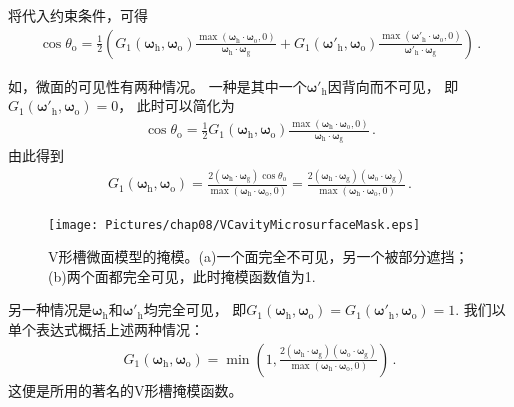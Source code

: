 将代入约束条件，可得
\begin{align}\label{eq:08ex01-V-Cavity-configurations}
    \cos\theta_{\mathrm{o}}=\frac{1}{2}\left(
    G_1({\bm\omega}_{\mathrm{h}},{\bm\omega}_{\mathrm{o}})
    \frac{\max({\bm\omega}_{\mathrm{h}}\cdot{\bm\omega}_{\mathrm{o}},0)}
    {{\bm\omega}_{\mathrm{h}}\cdot{\bm\omega}_{\mathrm{g}}}
    +G_1({\bm\omega}'_{\mathrm{h}},{\bm\omega}_{\mathrm{o}})
    \frac{\max({\bm\omega}'_{\mathrm{h}}\cdot{\bm\omega}_{\mathrm{o}},0)}
    {{\bm\omega}'_{\mathrm{h}}\cdot{\bm\omega}_{\mathrm{g}}}\right)\, .
\end{align}

如，微面的可见性有两种情况。
一种是其中一个${\bm\omega}'_{\mathrm{h}}$因背向而不可见，
即$G_1({\bm\omega}'_{\mathrm{h}},{\bm\omega}_{\mathrm{o}})=0$，
此时可以简化为
\begin{align}
    \cos\theta_{\mathrm{o}}=\frac{1}{2}G_1({\bm\omega}_{\mathrm{h}},{\bm\omega}_{\mathrm{o}})
    \frac{\max({\bm\omega}_{\mathrm{h}}\cdot{\bm\omega}_{\mathrm{o}},0)}
    {{\bm\omega}_{\mathrm{h}}\cdot{\bm\omega}_{\mathrm{g}}}\, .
\end{align}
由此得到
\begin{align}
    G_1({\bm\omega}_{\mathrm{h}},{\bm\omega}_{\mathrm{o}})
    =\frac{2({\bm\omega}_{\mathrm{h}}\cdot{\bm\omega}_{\mathrm{g}})\cos\theta_{\mathrm{o}}}
    {\max({\bm\omega}_{\mathrm{h}}\cdot{\bm\omega}_{\mathrm{o}},0)}
    =\frac{2({\bm\omega}_{\mathrm{h}}\cdot{\bm\omega}_{\mathrm{g}})
    ({\bm\omega}_{\mathrm{o}}\cdot{\bm\omega}_{\mathrm{g}})}
    {\max({\bm\omega}_{\mathrm{h}}\cdot{\bm\omega}_{\mathrm{o}},0)}\, .
\end{align}

\begin{figure}[htbp]
    \centering
    \texttt{[image: Pictures/chap08/VCavityMicrosurfaceMask.eps]}
    \caption{V形槽微面模型的掩模。(a)一个面完全不可见，另一个被部分遮挡；
        (b)两个面都完全可见，此时掩模函数值为1.}
    \label{fig:08ex01-V-cavityScattering-Mask}
\end{figure}

另一种情况是${\bm\omega}_{\mathrm{h}}$和${\bm\omega}'_{\mathrm{h}}$均完全可见，
即$G_1({\bm\omega}_{\mathrm{h}},{\bm\omega}_{\mathrm{o}})=G_1({\bm\omega}'_{\mathrm{h}},{\bm\omega}_{\mathrm{o}})=1$.
我们以单个表达式概括上述两种情况：
\begin{align}\label{eq:08ex01-V-Cavity-MaskingFunction}
    G_1({\bm\omega}_{\mathrm{h}},{\bm\omega}_{\mathrm{o}})
    =\min\left(1, \frac{2({\bm\omega}_{\mathrm{h}}\cdot{\bm\omega}_{\mathrm{g}})
    ({\bm\omega}_{\mathrm{o}}\cdot{\bm\omega}_{\mathrm{g}})}
    {\max({\bm\omega}_{\mathrm{h}}\cdot{\bm\omega}_{\mathrm{o}},0)}\right)\, .
\end{align}
这便是\citet{10.1145/357290.357293}所用的著名的V形槽掩模函数。

